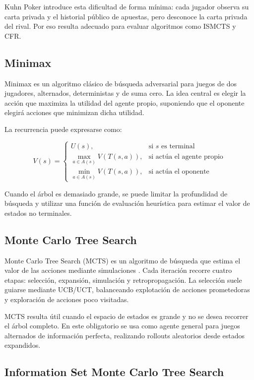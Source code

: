 \documentclass[letterpaper,12pt]{article}
\begin{document}
Kuhn Poker introduce esta dificultad de forma mínima: cada jugador observa su carta privada y el historial público de apuestas, pero desconoce la carta privada del rival. Por eso resulta adecuado para evaluar algoritmos como ISMCTS y CFR.

\subsection{Minimax}

Minimax es un algoritmo clásico de búsqueda adversarial para juegos de dos jugadores, alternados, deterministas y de suma cero. La idea central es elegir la acción que maximiza la utilidad del agente propio, suponiendo que el oponente elegirá acciones que minimizan dicha utilidad.

La recurrencia puede expresarse como:

\[
V(s) =
\begin{cases}
U(s), & \text{si } s \text{ es terminal} \\
\max_{a \in A(s)} V(T(s,a)), & \text{si actúa el agente propio} \\
\min_{a \in A(s)} V(T(s,a)), & \text{si actúa el oponente}
\end{cases}
\]

Cuando el árbol es demasiado grande, se puede limitar la profundidad de búsqueda y utilizar una función de evaluación heurística para estimar el valor de estados no terminales.

\subsection{Monte Carlo Tree Search}

Monte Carlo Tree Search (MCTS) es un algoritmo de búsqueda que estima el valor de las acciones mediante simulaciones \citep{kocsis2006}. Cada iteración recorre cuatro etapas: selección, expansión, simulación y retropropagación. La selección suele guiarse mediante UCB/UCT, balanceando explotación de acciones prometedoras y exploración de acciones poco visitadas.

MCTS resulta útil cuando el espacio de estados es grande y no se desea recorrer el árbol completo. En este obligatorio se usa como agente general para juegos alternados de información perfecta, realizando rollouts aleatorios desde estados expandidos.

\subsection{Information Set Monte Carlo Tree Search}
\end{document}
